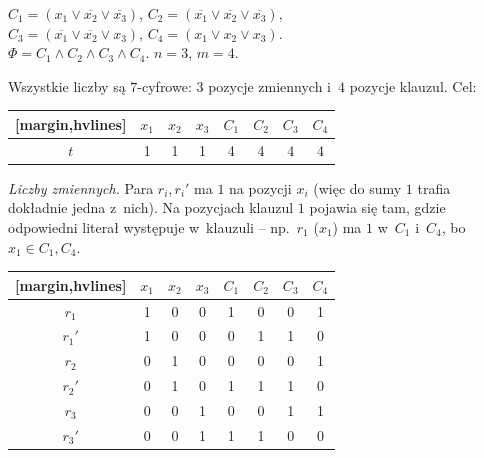 \begin{example}
	$C_1 = (x_1 \vee \overline{x_2} \vee \overline{x_3})$, \quad $C_2 = (\overline{x_1} \vee \overline{x_2} \vee \overline{x_3})$,\\
	$C_3 = (\overline{x_1} \vee \overline{x_2} \vee x_3)$, \quad $C_4 = (x_1 \vee x_2 \vee x_3)$.\\
	$\Phi = C_1 \wedge C_2 \wedge C_3 \wedge C_4$. \quad $n = 3$, $m = 4$.

	Wszystkie liczby są $7$-cyfrowe: $3$ pozycje zmiennych i~$4$ pozycje klauzul. Cel:
	\begin{table}[H]
		\centering
		\renewcommand{\arraystretch}{1.2}
		\begin{NiceTabular}{c|ccc|cccc}[margin,hvlines]
			    & $x_1$ & $x_2$ & $x_3$ & $C_1$ & $C_2$ & $C_3$ & $C_4$ \\
			\hline
			$t$ & 1     & 1     & 1     & 4     & 4     & 4     & 4     \\
		\end{NiceTabular}
	\end{table}

	\emph{Liczby zmiennych.} Para $r_i, r_i'$ ma $1$ na pozycji $x_i$ (więc do sumy $1$ trafia dokładnie jedna z~nich). Na pozycjach klauzul $1$ pojawia się tam, gdzie odpowiedni literał występuje w~klauzuli -- np.\ $r_1$ ($x_1$) ma $1$ w~$C_1$ i~$C_4$, bo $x_1 \in C_1, C_4$.
	\begin{table}[H]
		\centering
		\renewcommand{\arraystretch}{1.2}
		\begin{NiceTabular}{c|ccc|cccc}[margin,hvlines]
			       & $x_1$ & $x_2$ & $x_3$ & $C_1$ & $C_2$ & $C_3$ & $C_4$ \\
			\hline
			$r_1$  & 1     & 0     & 0     & 1     & 0     & 0     & 1     \\
			$r_1'$ & 1     & 0     & 0     & 0     & 1     & 1     & 0     \\
			$r_2$  & 0     & 1     & 0     & 0     & 0     & 0     & 1     \\
			$r_2'$ & 0     & 1     & 0     & 1     & 1     & 1     & 0     \\
			$r_3$  & 0     & 0     & 1     & 0     & 0     & 1     & 1     \\
			$r_3'$ & 0     & 0     & 1     & 1     & 1     & 0     & 0     \\
		\end{NiceTabular}
	\end{table}


\end{example}
